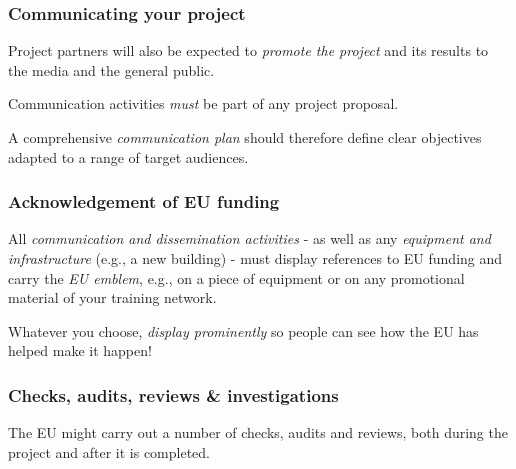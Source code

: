 \documentclass[oneside]{book}
\numberwithin{equation}{section}
\begin{document}
\subsubsection{Communicating your project}
Project partners will also be expected to \textit{promote the project} and its results to the media and the general public.

Communication activities \textit{must} be part of any project proposal.

%
A comprehensive \textit{communication plan} should therefore define clear objectives adapted to a range of target audiences.

\subsubsection{Acknowledgement of EU funding}
All \textit{communication and dissemination activities} - as well as any \textit{equipment and infrastructure} (e.g., a new building) - must display references to EU funding and carry the \textit{EU emblem}, e.g., on a piece of equipment or on any promotional material of your training network.

Whatever you choose, \textit{display prominently} so people can see how the EU has helped make it happen!

\subsubsection{Checks, audits, reviews \& investigations}
The EU might carry out a number of checks, audits and reviews, both during the project and after it is completed.
\end{document}
